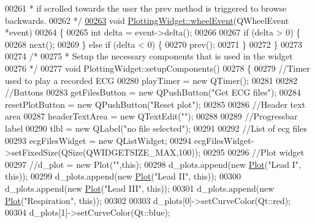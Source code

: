 \begin{DoxyCode}
00261 \textcolor{comment}{ * if scrolled towards the user the prev method is triggered to browse backwards.}
00262 \textcolor{comment}{ */}
\hypertarget{plottingwidget_8cpp_source.tex_l00263}{}\hyperlink{classPlottingWidget_abcb7d54e226df7067f821c954bb3589b}{00263} \textcolor{keywordtype}{void} \hyperlink{classPlottingWidget_abcb7d54e226df7067f821c954bb3589b}{PlottingWidget::wheelEvent}(QWheelEvent *event)
00264 \{
00265     \textcolor{keywordtype}{int} delta = \textcolor{keyword}{event}->delta();
00266 
00267     \textcolor{keywordflow}{if} (delta > 0) \{
00268         next();
00269     \} \textcolor{keywordflow}{else} \textcolor{keywordflow}{if} (delta < 0) \{
00270         prev();
00271     \}
00272 \}
00273 
00274 \textcolor{comment}{/*}
00275 \textcolor{comment}{ * Setup the necessary components that is used in the widget}
00276 \textcolor{comment}{ */}
00277 \textcolor{keywordtype}{void} PlottingWidget::setupComponents()
00278 \{
00279     \textcolor{comment}{//Timer used to play a recorded ECG}
00280     playTimer = \textcolor{keyword}{new} QTimer();
00281 
00282     \textcolor{comment}{//Buttons}
00283     getFilesButton = \textcolor{keyword}{new} QPushButton(\textcolor{stringliteral}{"Get ECG files"});
00284     resetPlotButton = \textcolor{keyword}{new} QPushButton(\textcolor{stringliteral}{"Reset plot"});
00285 
00286     \textcolor{comment}{//Header text area}
00287     headerTextArea = \textcolor{keyword}{new} QTextEdit(\textcolor{stringliteral}{""});
00288 
00289     \textcolor{comment}{//Progressbar label}
00290     tlbl = \textcolor{keyword}{new} QLabel(\textcolor{stringliteral}{"no file selected"});
00291 
00292     \textcolor{comment}{//List of ecg files}
00293     ecgFilesWidget = \textcolor{keyword}{new} QListWidget;
00294     ecgFilesWidget->setFixedSize(QSize(QWIDGETSIZE\_MAX,100));
00295 
00296     \textcolor{comment}{//Plot widget}
00297     \textcolor{comment}{//d\_plot = new Plot("",this);}
00298     d\_plots.append(\textcolor{keyword}{new} \hyperlink{classPlot}{Plot}(\textcolor{stringliteral}{"Lead I"}, \textcolor{keyword}{this}));
00299     d\_plots.append(\textcolor{keyword}{new} \hyperlink{classPlot}{Plot}(\textcolor{stringliteral}{"Lead II"}, \textcolor{keyword}{this}));
00300     d\_plots.append(\textcolor{keyword}{new} \hyperlink{classPlot}{Plot}(\textcolor{stringliteral}{"Lead III"}, \textcolor{keyword}{this}));
00301     d\_plots.append(\textcolor{keyword}{new} \hyperlink{classPlot}{Plot}(\textcolor{stringliteral}{"Respiration"}, \textcolor{keyword}{this}));
00302 
00303     d\_plots[0]->setCurveColor(Qt::red);
00304     d\_plots[1]->setCurveColor(Qt::blue);

\end{DoxyCode}
